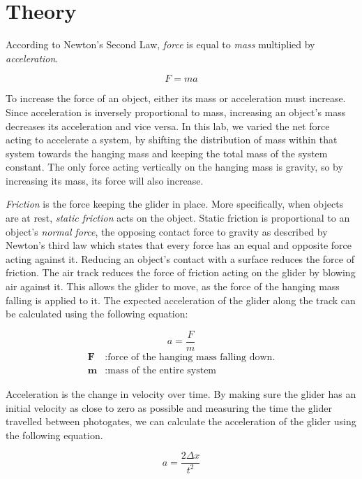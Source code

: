 \section{Theory}
\vspace{-0.5cm}
\singlespacing

According to Newton's Second Law, \textit{force} is equal to \textit{mass} multiplied by \textit{acceleration}. \par

\vspace{-0.5cm}
\begin{equation*}
F = ma	
\end{equation*}

To increase the force of an object, either its mass or acceleration must increase. Since acceleration is inversely proportional to mass, increasing an object's mass decreases its acceleration and vice versa. In this lab, we varied the net force acting to accelerate a system, by shifting the distribution of mass within that system towards the hanging mass and keeping the total mass of the system constant. The only force acting vertically on the hanging mass is gravity, so by increasing its mass, its force will also increase.\par 

\textit{Friction} is the force keeping the glider in place. More specifically, when objects are at rest, \textit{static friction} acts on the object. Static friction is proportional to an object's \textit{normal force}, the opposing contact force to gravity as described by Newton's third law which states that every force has an equal and opposite force acting against it. Reducing an object's contact with a surface reduces the force of friction. The air track reduces the force of friction acting on the glider by blowing air against it. This allows the glider to move, as the force of the hanging mass falling is applied to it. The expected acceleration of the glider along the track can be calculated using the following equation: 

\vspace{-0.5cm}
{\centering
	\begin{equation*}
		a = \frac{F}{m}	
	\end{equation*}
\vspace{-0.5cm}
\begin{align*}
	\boldsymbol{F} &: \text{force of the hanging mass falling down.} \\
\boldsymbol{m} &: \text{mass of the entire system}
\end{align*}
}
 
Acceleration is the change in velocity over time. By making sure the glider has an initial velocity as close to zero as possible and measuring the time the glider travelled between photogates, we can calculate the acceleration of the glider using the following equation. 

\begin{equation*}
	a = \frac{2\Delta{x}}{t^2}	
\end{equation*}

\newpage

